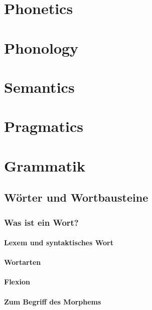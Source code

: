 \documentclass{report}
\begin{document}
\part{Phonetics}



\part{Phonology}



\part{Semantics}
%




%
%

\part{Pragmatics}
%

\part{Grammatik}

\chapter{Wörter und Wortbausteine}

	\section{Was ist ein Wort?}
		
		\newpage
		\subsection{Lexem und syntaktisches Wort}
		
		\subsection{Wortarten}
		\subsection{Flexion}
		\subsection{Zum Begriff des Morphems}
\end{document}
